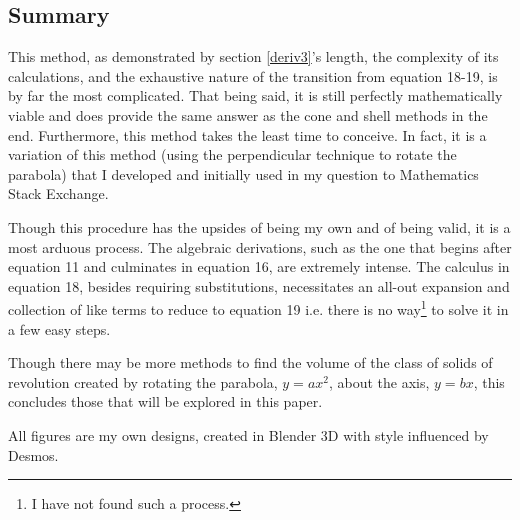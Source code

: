 \documentclass{article}
\begin{document}
\subsection{Summary}
This method, as demonstrated by section \ref{deriv3}'s length, the complexity of its calculations, and the exhaustive nature of the transition from equation 18-19, is by far the most complicated. That being said, it is still perfectly mathematically viable and does provide the same answer as the cone and shell methods in the end. Furthermore, this method takes the least time to conceive. In fact, it is a variation of this method (using the perpendicular technique to rotate the parabola) that I developed and initially used in my question \cite{BIB:disk2} to Mathematics Stack Exchange.\par
Though this procedure has the upsides of being my own and of being valid, it is a most arduous process. The algebraic derivations, such as the one that begins after equation 11 and culminates in equation 16, are extremely intense. The calculus in equation 18, besides requiring substitutions, necessitates an all-out expansion and collection of like terms to reduce to equation 19 i.e. there is no way\footnote{I have not found such a process.} to solve it in a few easy steps.\par
Though there may be more methods to find the volume of the class of solids of revolution created by rotating the parabola, $y=ax^2$, about the axis, $y=bx$, this concludes those that will be explored in this paper.
\newpage
\setcounter{secnumdepth}{0}



All figures are my own designs, created in Blender 3D with style influenced by Desmos.
\end{document}

